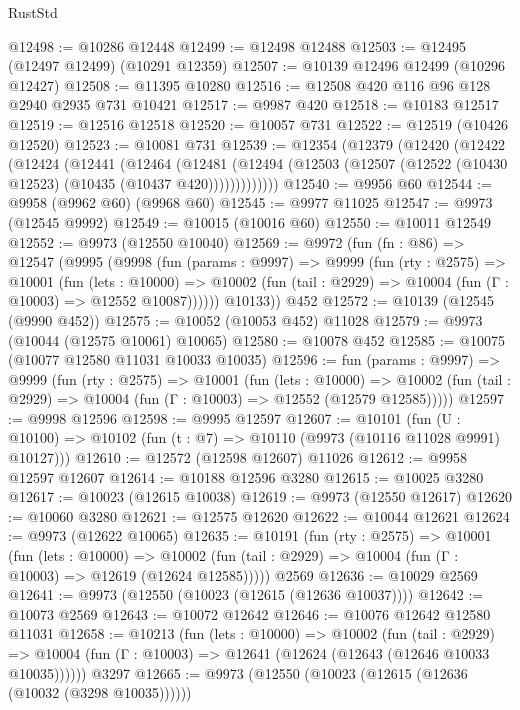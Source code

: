 \begin{lexlean}{RustStd}
\begin{coremodule}
@12498 := @10286 @12448
@12499 := @12498 @12488
@12503 := @12495 (@12497 @12499) (@10291 @12359)
@12507 := @10139 @12496 @12499 (@10296 @12427)
@12508 := @11395 @10280
@12516 := @12508 @420 @116 @96 @128 @2940 @2935 @731 @10421
@12517 := @9987 @420
@12518 := @10183 @12517
@12519 := @12516 @12518
@12520 := @10057 @731
@12522 := @12519 (@10426 @12520)
@12523 := @10081 @731
@12539 := @12354
    (@12379
      (@12420
        (@12422
          (@12424
            (@12441
              (@12464
                (@12481
                  (@12494 (@12503 (@12507 (@12522 (@10430 @12523) (@10435 (@10437 @420)))))))))))))
@12540 := @9956 @60
@12544 := @9958 (@9962 @60) (@9968 @60)
@12545 := @9977 @11025
@12547 := @9973 (@12545 @9992)
@12549 := @10015 (@10016 @60)
@12550 := @10011 @12549
@12552 := @9973 (@12550 @10040)
@12569 := @9972
    (fun (fn : @86) =>
    @12547
      (@9995
        (@9998
          (fun (params : @9997) =>
          @9999
            (fun (rty : @2575) =>
            @10001
              (fun (lets : @10000) =>
              @10002 (fun (tail : @2929) => @10004 (fun (Γ : @10003) => @12552 @10087))))))
        @10133))
    @452
@12572 := @10139 (@12545 (@9990 @452))
@12575 := @10052 (@10053 @452) @11028
@12579 := @9973 (@10044 (@12575 @10061) @10065)
@12580 := @10078 @452
@12585 := @10075 (@10077 @12580 @11031 @10033 @10035)
@12596 := fun (params : @9997) =>
  @9999
    (fun (rty : @2575) =>
    @10001
      (fun (lets : @10000) =>
      @10002 (fun (tail : @2929) => @10004 (fun (Γ : @10003) => @12552 (@12579 @12585)))))
@12597 := @9998 @12596
@12598 := @9995 @12597
@12607 := @10101
    (fun (U : @10100) => @10102 (fun (t : @7) => @10110 (@9973 (@10116 @11028 @9991) @10127)))
@12610 := @12572 (@12598 @12607) @11026
@12612 := @9958 @12597 @12607
@12614 := @10188 @12596 @3280
@12615 := @10025 @3280
@12617 := @10023 (@12615 @10038)
@12619 := @9973 (@12550 @12617)
@12620 := @10060 @3280
@12621 := @12575 @12620
@12622 := @10044 @12621
@12624 := @9973 (@12622 @10065)
@12635 := @10191
    (fun (rty : @2575) =>
    @10001
      (fun (lets : @10000) =>
      @10002 (fun (tail : @2929) => @10004 (fun (Γ : @10003) => @12619 (@12624 @12585)))))
    @2569
@12636 := @10029 @2569
@12641 := @9973 (@12550 (@10023 (@12615 (@12636 @10037))))
@12642 := @10073 @2569
@12643 := @10072 @12642
@12646 := @10076 @12642 @12580 @11031
@12658 := @10213
    (fun (lets : @10000) =>
    @10002
      (fun (tail : @2929) =>
      @10004 (fun (Γ : @10003) => @12641 (@12624 (@12643 (@12646 @10033 @10035))))))
    @3297
@12665 := @9973 (@12550 (@10023 (@12615 (@12636 (@10032 (@3298 @10035))))))

\end{coremodule}
\end{lexlean}
